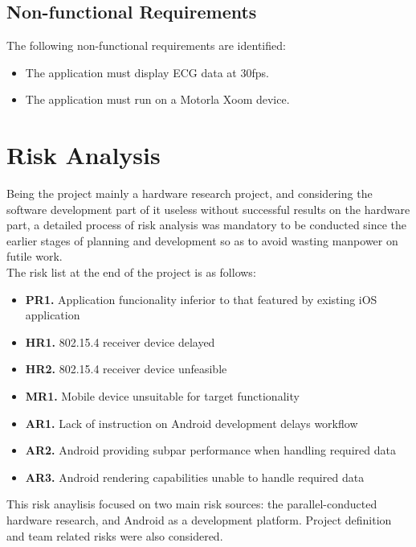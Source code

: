 
		\subsection{Non-functional Requirements}

		The following non-functional requirements are identified:
		\begin{itemize}
			\item The application must display ECG data at 30fps.
			\item The application must run on a Motorla Xoom device.
		\end{itemize}

	\section{Risk Analysis}

		Being the project mainly a hardware research project, and considering the software development part of it useless without successful results on the hardware part, a detailed process of risk analysis was mandatory to be conducted since the earlier stages of planning and development so as to avoid wasting manpower on futile work.\\

		The risk list at the end of the project is as follows:
		\begin{itemize}
		\item \textbf{PR1.} Application funcionality inferior to that featured by existing iOS application

		\item \textbf{HR1.} 802.15.4 receiver device delayed
		\item \textbf{HR2.} 802.15.4 receiver device unfeasible

		\item \textbf{MR1.} Mobile device unsuitable for target functionality

		\item \textbf{AR1.} Lack of instruction on Android development delays workflow
		\item \textbf{AR2.} Android providing subpar performance when handling required data
		\item \textbf{AR3.} Android rendering capabilities unable to handle required data
		\end{itemize}

		This risk anaylisis focused on two main risk sources: the parallel-conducted hardware research, and Android as a development platform. Project definition and team related risks were also considered.\\

